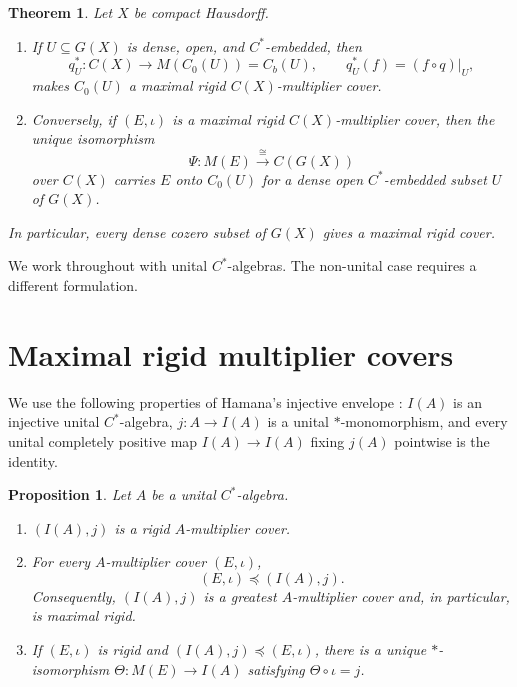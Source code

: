 \documentclass[11pt,a4paper]{amsart}
\numberwithin{equation}{section}
\theoremstyle{paperplain}
\newtheorem{theorem}{Theorem}
\newtheorem{proposition}{Proposition}[section]
\theoremstyle{remark}
\begin{document}
\begin{theorem}\label{thm:B}
Let $X$ be compact Hausdorff.
\begin{enumerate}[label=\textup{(\roman*)},leftmargin=2.5em]
\item If $U\subseteq G(X)$ is dense, open, and $C^*$-embedded, then
\[
q_U^*\colon C(X)\longrightarrow M(C_0(U))=C_b(U),
\qquad q_U^*(f)=(f\circ q)|_U,
\]
makes $C_0(U)$ a maximal rigid $C(X)$-multiplier cover.
\item Conversely, if $(E,\iota)$ is a maximal rigid $C(X)$-multiplier cover, then the unique isomorphism
\[
\Psi\colon M(E)\xrightarrow{\ \cong\ }C(G(X))
\]
over $C(X)$ carries $E$ onto $C_0(U)$ for a dense open $C^*$-embedded subset $U$ of $G(X)$.
\end{enumerate}
In particular, every dense cozero subset of $G(X)$ gives a maximal rigid cover.
\end{theorem}

We work throughout with unital $C^*$-algebras. The non-unital case requires a different formulation.

\section{Maximal rigid multiplier covers}

We use the following properties of Hamana's injective envelope \cite{Hamana1979OS,Hamana1979Cstar}: $I(A)$ is an injective unital $C^*$-algebra, $j\colon A\to I(A)$ is a unital $*$-monomorphism, and every unital completely positive map $I(A)\to I(A)$ fixing $j(A)$ pointwise is the identity.

\begin{proposition}\label{prop:three-parts}
Let $A$ be a unital $C^*$-algebra.
\begin{enumerate}[label=\textup{(\roman*)},leftmargin=2.5em]
\item $(I(A),j)$ is a rigid $A$-multiplier cover.
\item For every $A$-multiplier cover $(E,\iota)$,
\[
(E,\iota)\preccurlyeq(I(A),j).
\]
Consequently, $(I(A),j)$ is a greatest $A$-multiplier cover and, in particular, is maximal rigid.
\item If $(E,\iota)$ is rigid and $(I(A),j)\preccurlyeq(E,\iota)$, there is a unique $*$-isomorphism $\Theta\colon M(E)\to I(A)$ satisfying $\Theta\circ\iota=j$.
\end{enumerate}
\end{proposition}
\end{document}

